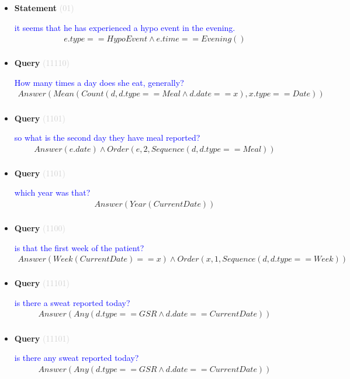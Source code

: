 \documentclass[11pt]{article}
\newcommand{\key}[1]{\textcolor{lightgray}{#1}}
\newcounter{CQuery}
\newcounter{CStatement}
\begin{document}
\begin{itemize}
\item
\textbf{Statement\theCStatement} \key{(01)} \addtocounter{CStatement}{1}
\textcolor{blue}{ it seems that he has experienced a hypo event in the evening. }
\begin{multline*}
e.type==HypoEvent \wedge e.time==Evening() \\ 
\end{multline*}


\item
\textbf{Query\theCQuery} \key{(11110)} \addtocounter{CQuery}{1}
\textcolor{blue}{ How many times a day does she eat, generally? }
\begin{multline*}
Answer(Mean(Count(d, d.type==Meal \wedge d.date==x), x.type==Date)) \\ 
\end{multline*}


\item
\textbf{Query\theCQuery} \key{(1101)} \addtocounter{CQuery}{1}
\textcolor{blue}{ so what is the second day they have meal reported? }
\begin{multline*}
Answer(e.date) \wedge Order(e, 2, Sequence(d, d.type==Meal)) \\ 
\end{multline*}


\item
\textbf{Query\theCQuery} \key{(1101)} \addtocounter{CQuery}{1}
\textcolor{blue}{ which year was that? }
\begin{multline*}
Answer(Year(CurrentDate)) \\ 
\end{multline*}


\item
\textbf{Query\theCQuery} \key{(1100)} \addtocounter{CQuery}{1}
\textcolor{blue}{ is that the first week of the patient? }
\begin{multline*}
Answer(Week(CurrentDate)==x) \wedge Order(x, 1, Sequence(d, d.type==Week)) \\ 
\end{multline*}


\item
\textbf{Query\theCQuery} \key{(11101)} \addtocounter{CQuery}{1}
\textcolor{blue}{ is there a sweat reported today? }
\begin{multline*}
Answer(Any(d.type==GSR \wedge d.date==CurrentDate)) \\ 
\end{multline*}


\item
\textbf{Query\theCQuery} \key{(11101)} \addtocounter{CQuery}{1}
\textcolor{blue}{ is there any sweat reported today? }
\begin{multline*}
Answer(Any(d.type==GSR \wedge d.date==CurrentDate)) \\ 
\end{multline*}



\end{itemize}
\end{document}
